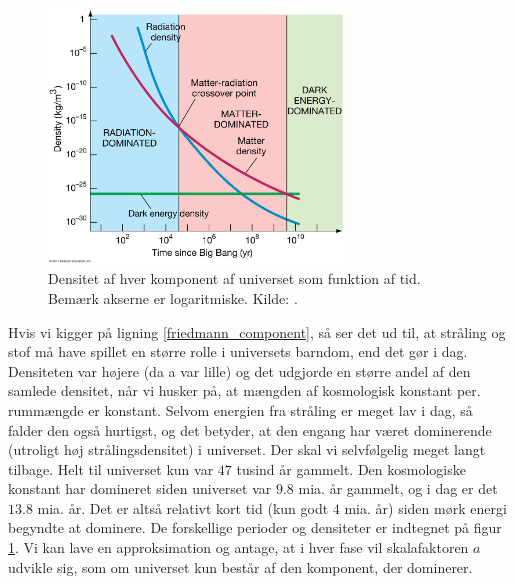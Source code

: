 \begin{figure}[t]
	\centering
	\includegraphics[width=0.7\textwidth]{Kosmo/2017/img/density.jpg}
	\caption{Densitet af hver komponent af universet som funktion af tid. Bemærk akserne er logaritmiske. Kilde: \cite{brauComponentsUniverse}.}
	\label{figDensity}
\end{figure}
%
Hvis vi kigger på ligning \eqref{friedmann_component}, så ser det ud til, at stråling og stof må have spillet en større rolle i universets barndom, end det gør i dag. Densiteten var højere (da a var lille) og det udgjorde en større andel af den samlede densitet, når vi husker på, at mængden af kosmologisk konstant per. rummængde er konstant. Selvom energien fra stråling er meget lav i dag, så falder den også hurtigst, og det betyder, at den engang har været dominerende (utroligt høj strålingsdensitet) i universet. Der skal vi selvfølgelig meget langt tilbage. Helt til universet kun var $47$ tusind år gammelt. Den kosmologiske konstant har domineret siden universet var $9.8$ mia. år gammelt, og i dag er det $13.8$ mia. år. Det er altså relativt kort tid (kun godt $4$ mia. år) siden  mørk energi begyndte at dominere. De forskellige perioder og densiteter er indtegnet på figur \ref{figDensity}.
Vi kan lave en approksimation og antage, at i hver fase vil skalafaktoren $a$ udvikle sig, som om universet kun består af den komponent, der dominerer.
%
